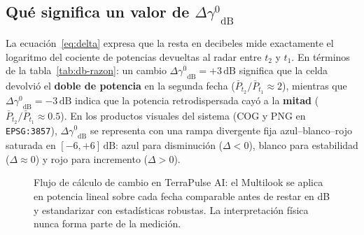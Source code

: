 \documentclass[11pt,a4paper]{article}
\newcommand{\unit}[1]{\mathrm{#1}}
\newcommand{\gz}{\ensuremath{\gamma^{0}}}
\begin{document}
\subsection{Qué significa un valor de $\Delta\gz_{\mathrm{dB}}$}

La ecuación~\eqref{eq:delta} expresa que la resta en decibeles mide exactamente el logaritmo del cociente de
potencias devueltas al radar entre $t_2$ y $t_1$. En términos de la tabla~\ref{tab:db-razon}: un cambio
$\Delta\gz_{\mathrm{dB}} = +3\,\unit{dB}$ significa que la celda devolvió el \textbf{doble de potencia} en la
segunda fecha ($\bar{P}_{t_2}/\bar{P}_{t_1} \approx 2$), mientras que $\Delta\gz_{\mathrm{dB}} = -3\,\unit{dB}$
indica que la potencia retrodispersada cayó a la \textbf{mitad} ($\bar{P}_{t_2}/\bar{P}_{t_1} \approx 0.5$).
En los productos visuales del sistema (COG y PNG en \texttt{EPSG:3857}), $\Delta\gz_{\mathrm{dB}}$ se
representa con una rampa divergente fija azul--blanco--rojo saturada en $[-6, +6]\,\unit{dB}$: azul para
disminución ($\Delta < 0$), blanco para estabilidad ($\Delta \approx 0$) y rojo para incremento ($\Delta > 0$).

\begin{figure}[htbp]
\centering
{}
\caption{Flujo de cálculo de cambio en TerraPulse AI: el Multilook se aplica en potencia lineal sobre cada fecha
comparable antes de restar en dB y estandarizar con estadísticas robustas. La interpretación física nunca forma
parte de la medición.}
\label{fig:flujo-delta}
\end{figure}
\end{document}
